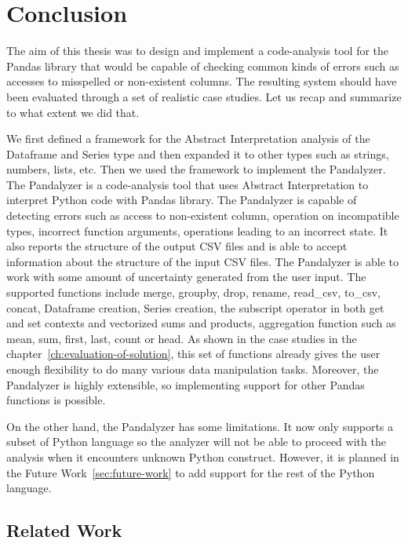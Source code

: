 \chapter*{Conclusion}

The aim of this thesis was to design and implement a code-analysis tool for the Pandas library that would be capable of
checking common kinds of errors such as accesses to misspelled or non-existent columns.
The resulting system should have been evaluated through a set of realistic case studies.
Let us recap and summarize to what extent we did that.

We first defined a framework for the Abstract Interpretation analysis of the Dataframe and Series type and then expanded it
to other types such as strings, numbers, lists, etc.
Then we used the framework to implement the Pandalyzer.
The Pandalyzer is a code-analysis tool that uses Abstract Interpretation to interpret Python code with Pandas
library.
The Pandalyzer is capable of detecting errors such as access to non-existent column, operation on incompatible types,
incorrect function arguments, operations leading to an incorrect state.
It also reports the structure of the output CSV files and is able to accept information about the structure of the input CSV files.
The Pandalyzer is able to work with some amount of uncertainty generated from the user input.
The supported functions include merge, groupby, drop, rename, read\_csv, to\_csv, concat, Dataframe creation,
Series creation, the subscript operator in both get and set contexts and vectorized sums and products, aggregation function
such as mean, sum, first, last, count or head.
As shown in the case studies in the chapter~\ref{ch:evaluation-of-solution}, this set of functions already gives
the user enough flexibility to do many various data manipulation tasks.
Moreover, the Pandalyzer is highly extensible, so implementing support for other Pandas functions is possible.

On the other hand, the Pandalyzer has some limitations.
It now only supports a subset of Python language so the analyzer will not be able to proceed with the analysis when
it encounters unknown Python construct.
However, it is planned in the Future Work~\ref{sec:future-work} to add support for the rest of the Python language.

\section*{Related Work}

